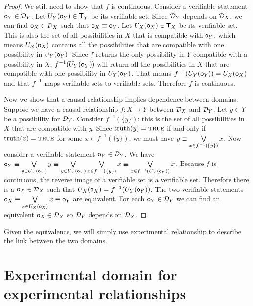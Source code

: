 \documentclass[11pt,letterpaper,fleqn]{memoir} %
\begin{document}
\begin{mathSection}
\begin{proof}
		We still need to show that $f$ is continuous. Consider a verifiable statement $\mathsf{o}_Y \in \mathcal{D}_Y$. Let $U_Y(\mathsf{o}_Y) \in \mathsf{T}_Y$ be its verifiable set. Since $\mathcal{D}_Y$ depends on $\mathcal{D}_X$, we can find $\mathsf{o}_X \in \mathcal{D}_X$ such that $\mathsf{o}_X \equiv \mathsf{o}_Y$. Let $U_X(\mathsf{o}_X) \in \mathsf{T}_X$ be its verifiable set. This is also the set of all possibilities in $X$ that is compatible with $\mathsf{o}_Y$, which means $U_X(\mathsf{o}_X)$ contains all the possibilities that are compatible with one possibility in $U_Y(\mathsf{o}_Y)$. Since $f$ returns the only possibility in $Y$ compatible with a possibility in $X$, $f^{-1}(U_Y(\mathsf{o}_Y))$ will return all the possibilities in $X$ that are compatible with one possibility in $U_Y(\mathsf{o}_Y)$. That means $f^{-1}(U_Y(\mathsf{o}_Y)) = U_X(\mathsf{o}_X)$ and that $f^{-1}$ maps verifiable sets to verifiable sets. Therefore $f$ is continuous.
		
		Now we show that a causal relationship implies dependence between domains. Suppose we have a causal relationship $f: X \to Y$ between $\mathcal{D}_X$ and $\mathcal{D}_Y$. Let $y \in Y$ be a possibility for $\mathcal{D}_Y$. Consider   $f^{-1}(\{y\})$: this is the set of all possibilities in $X$ that are compatible with $y$. Since $\operatorname{truth}(y)=\textsc{true}$ if and only if $\operatorname{truth}(x)=\textsc{true}$ for some $x \in f^{-1}(\{y\})$, we must have $y \equiv \bigvee\limits_{x \in f^{-1}(\{y\})} x$. Now consider a verifiable statement $\mathsf{o}_Y \in \mathcal{D}_Y$. We have $\mathsf{o}_Y \equiv \bigvee\limits_{y \in U_Y(\mathsf{o}_Y)} y \equiv \bigvee\limits_{y \in U_Y(\mathsf{o}_Y)} \bigvee\limits_{x \in f^{-1}(\{y\})} x \equiv \bigvee\limits_{x \in f^{-1}(U_Y(\mathsf{o}_Y))} x$. Because $f$ is continuous, the reverse image of a verifiable set is a verifiable set. Therefore there is a $\mathsf{o}_X \in \mathcal{D}_X$ such that $U_X(\mathsf{o}_X) = f^{-1}(U_Y(\mathsf{o}_Y))$. The two verifiable statements $\mathsf{o}_X \equiv \bigvee\limits_{x \in U_X(\mathsf{o}_X)} x \equiv \mathsf{o}_Y$ are equivalent. For each $\mathsf{o}_Y \in \mathcal{D}_Y$ we can find an equivalent $\mathsf{o}_X \in \mathcal{D}_X$ so $\mathcal{D}_Y$ depends on $\mathcal{D}_X$.
	\end{proof}
\end{mathSection}

Given the equivalence, we will simply use experimental relationship to describe the link between the two domains.

\section{Experimental domain for experimental relationships}
\end{document}
